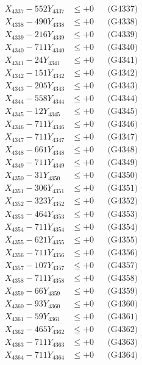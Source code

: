 \documentclass[a4paper,10pt]{article}
\begin{document}
{\begin{align}
X_{4337} - 552Y_{4337} &\leq +0 && \text{(G4337)} \\
X_{4338} - 490Y_{4338} &\leq +0 && \text{(G4338)} \\
X_{4339} - 216Y_{4339} &\leq +0 && \text{(G4339)} \\
X_{4340} - 711Y_{4340} &\leq +0 && \text{(G4340)} \\
\allowbreak
X_{4341} - 24Y_{4341} &\leq +0 && \text{(G4341)} \\
X_{4342} - 151Y_{4342} &\leq +0 && \text{(G4342)} \\
X_{4343} - 205Y_{4343} &\leq +0 && \text{(G4343)} \\
X_{4344} - 558Y_{4344} &\leq +0 && \text{(G4344)} \\
X_{4345} - 12Y_{4345} &\leq +0 && \text{(G4345)} \\
X_{4346} - 711Y_{4346} &\leq +0 && \text{(G4346)} \\
X_{4347} - 711Y_{4347} &\leq +0 && \text{(G4347)} \\
X_{4348} - 661Y_{4348} &\leq +0 && \text{(G4348)} \\
X_{4349} - 711Y_{4349} &\leq +0 && \text{(G4349)} \\
X_{4350} - 31Y_{4350} &\leq +0 && \text{(G4350)} \\
\allowbreak
X_{4351} - 306Y_{4351} &\leq +0 && \text{(G4351)} \\
X_{4352} - 323Y_{4352} &\leq +0 && \text{(G4352)} \\
X_{4353} - 464Y_{4353} &\leq +0 && \text{(G4353)} \\
X_{4354} - 711Y_{4354} &\leq +0 && \text{(G4354)} \\
X_{4355} - 621Y_{4355} &\leq +0 && \text{(G4355)} \\
X_{4356} - 711Y_{4356} &\leq +0 && \text{(G4356)} \\
X_{4357} - 107Y_{4357} &\leq +0 && \text{(G4357)} \\
X_{4358} - 711Y_{4358} &\leq +0 && \text{(G4358)} \\
X_{4359} - 66Y_{4359} &\leq +0 && \text{(G4359)} \\
X_{4360} - 93Y_{4360} &\leq +0 && \text{(G4360)} \\
\allowbreak
X_{4361} - 59Y_{4361} &\leq +0 && \text{(G4361)} \\
X_{4362} - 465Y_{4362} &\leq +0 && \text{(G4362)} \\
X_{4363} - 711Y_{4363} &\leq +0 && \text{(G4363)} \\
X_{4364} - 711Y_{4364} &\leq +0 && \text{(G4364)} \\

\end{align}}
\end{document}
